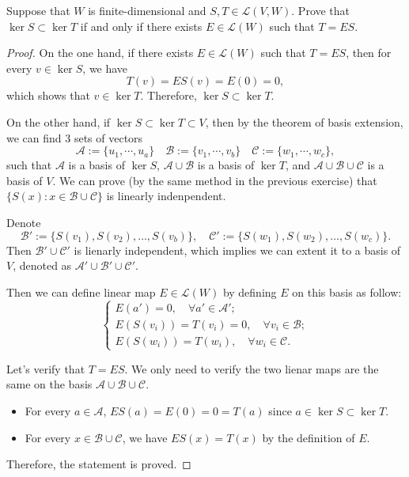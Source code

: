 \documentclass{article}
\begin{document}
\begin{problem}[3B-25]
    Suppose that \( W \) is finite-dimensional and \( S,T\in \mathcal{L }(V,W) \). Prove that \( \ker S\subset \ker T \) if and only if there exists \( E\in \mathcal{L }(W) \) such that \( T=ES \). 
\end{problem}

\begin{proof}
    On the one hand, if there exists \( E \in \mathcal{L}(W) \) such that \( T = ES \), then for every \( v \in \ker S \), we have
    \[ T(v) = ES(v) = E(0) = 0, \]
    which shows that \( v \in \ker T \). Therefore, \( \ker S \subset \ker T \). \par
    On the other hand, if \( \ker S\subset\ker T\subset V \), then by the theorem of basis extension, we can find \( 3 \) sets of vectors
    \[ \mathcal{A }:=\{u_1,\cdots,u_a\}\quad \mathcal{B }:=\{v_1,\cdots,v_b\}\quad \mathcal{C }:=\{w_1,\cdots,w_c\}, \]
    such that \( \mathcal{A} \) is a basis of \( \ker S \), \( \mathcal{A} \cup \mathcal{B} \) is a basis of \( \ker T \), and \( \mathcal{A} \cup \mathcal{B} \cup \mathcal{C} \) is a basis of \( V \). We can prove (by the same method in the previous exercise) that \( \{S(x):x\in \mathcal{B}\cup \mathcal{C}\} \) is linearly indenpendent. \par
    Denote
    \[ \mathcal{B}' := \{S(v_1), S(v_2), \ldots, S(v_b)\},\quad \mathcal{C }' := \{S(w_1), S(w_2), \ldots, S(w_c)\}. \] 
    Then \( \mathcal{B}'\cup \mathcal{C}' \) is lienarly independent, which implies we can extent it to a basis of \( V \), denoted as \( \mathcal{A}' \cup \mathcal{B}' \cup \mathcal{C}' \). \par 
    Then we can define linear map \( E\in \mathcal{L }(W) \) by defining \( E \) on this basis as follow:
    \[ \begin{cases}
        E(a')=0 , \quad\forall a'\in \mathcal{A}';\\
        E(S(v_i))=T(v_i)=0, \quad\forall v_i\in \mathcal{B};\\
        E(S(w_i))=T(w_i), \quad\forall w_i\in\mathcal{C}.
    \end{cases} \]\par
    Let's verify that \( T=ES \). We only need to verify the two lienar maps are the same on the basis \( \mathcal{A}\cup \mathcal{B}\cup \mathcal{C}. \)
    \begin{itemize}
        \item For every \( a\in \mathcal{A} \), \( ES(a)=E(0)=0=T(a) \) since \( a\in\ker S\subset \ker T \).
        \item For every \( x\in\mathcal{B}\cup\mathcal{C} \), we have \( ES(x)=T(x) \) by the definition of \( E \).
    \end{itemize}
    Therefore, the statement is proved.
\end{proof}
\end{document}
